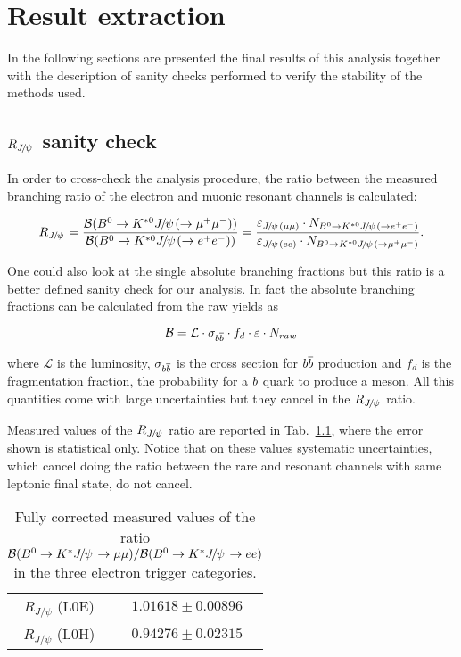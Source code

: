 \chapter{Result extraction}
\label{sec:RKst_result}

In the following sections are presented the final results of this analysis
together with the description of sanity checks performed to verify the stability
of the methods used.

\section{$R_{\jpsi}$ sanity check}

In order to cross-check the analysis procedure, the ratio between the
measured branching ratio of the electron and muonic resonant channels is calculated:

\begin{equation}
R_{\jpsi} = \frac{\BR(\Bz\to\Kstarz\jpsi(\to \mumu))} {\BR(\Bz\to\Kstarz\jpsi(\to \epem))} 
= \frac{\varepsilon_{\jpsi(\mu\mu)} \cdot N_{\Bz\to\Kstarz\jpsi(\to \epem)}}{\varepsilon_{\jpsi(ee)} 
\cdot N_{\Bz\to\Kstarz\jpsi(\to \mumu)}}.
\end{equation}

One could also look at the single absolute branching fractions but this ratio
is a better defined sanity check for our analysis. In fact the absolute branching fractions
can be calculated from the raw yields as

\begin{equation}
{\ensuremath{\cal B}} = \mathcal{L} \cdot \sigma_{{b}{\overline {{b}}}} \cdot f_d \cdot \varepsilon \cdot N_{raw}
\end{equation}

where $\mathcal{L}$ is the luminosity, $\sigma_{{b}{\overline {{b}}}}$ is the cross
section for ${b}{\overline {{b}}}$ production and $f_d$ is the fragmentation fraction,
the probability for a ${b}$ quark to produce a \Bz meson.
All this quantities come with large uncertainties but they cancel in the $R_{\jpsi}$ ratio.

Measured values of the $R_{\jpsi}$ ratio are reported in Tab.~\ref{tab:Rjpsi}, where
the error shown is statistical only. Notice that on these values systematic uncertainties,
which cancel doing the ratio between the rare and resonant channels with same leptonic
final state, do not cancel.

\begin{table}[h!]
\centering
 \caption{Fully corrected measured values of the ratio
 $\BR(\Bz\to\Kstar\jpsi\to \mu\mu) / \BR(\Bz\to\Kstar\jpsi\to ee)$
 in the three electron trigger categories. }
\begin{tabular}{c|c}
$R_{J/\psi}$ (L0E) 	& $ 1.01618  \pm  0.00896 $ \\
$R_{J/\psi}$ (L0H) 	& $ 0.94276  \pm  0.02315 $ \\
  \end{tabular}
 \label{tab:Rjpsi}
\end{table}

